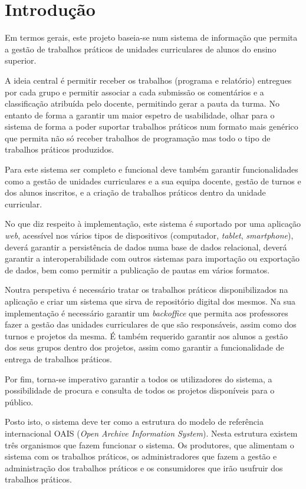 \section{Introdução}
Em termos gerais, este projeto baseia-se num sistema de informação que permita a gestão de trabalhos 
práticos de unidades curriculares de alunos do ensino superior.

A ideia central é permitir receber os trabalhos (programa e relatório) entregues por cada grupo e 
permitir associar a cada submissão os comentários e a classificação atribuída pelo docente, 
permitindo gerar a pauta da turma. No entanto de forma a garantir um maior 
espetro de usabilidade, olhar para o sistema de forma a poder suportar 
trabalhos práticos num formato mais genérico que permita não só receber 
trabalhos de programação mas todo o tipo de trabalhos práticos produzidos.

Para este sistema ser completo e funcional deve também garantir funcionalidades como
a gestão de unidades curriculares e a sua equipa docente,  gestão de turnos e dos alunos inscritos, e a
criação de trabalhos práticos dentro da unidade curricular.

No que diz respeito à implementação, este sistema é suportado por uma aplicação \textit{web}, acessível
nos vários tipos de dispositivos (computador, \textit{tablet}, \textit{smartphone}), deverá garantir a persistência de 
dados numa base de dados relacional, deverá garantir a interoperabilidade com outros sistemas para
importação ou exportação de dados, bem como permitir a publicação de pautas em vários formatos.

Noutra perspetiva é necessário tratar os trabalhos práticos disponibilizados na aplicação
e criar um sistema que sirva de repositório digital dos mesmos. Na sua implementação é necessário
garantir um \textit{backoffice} que permita aos professores fazer a gestão das unidades curriculares
de que são responsáveis, assim como dos turnos e projetos da mesma. É também requerido garantir
aos alunos a gestão dos seus grupos dentro dos projetos, assim como garantir a funcionalidade
de entrega de trabalhos práticos.
 
 Por fim, torna-se imperativo garantir a todos os utilizadores do sistema, a possibilidade de procura
 e consulta de todos os projetos disponíveis para o público.
 
 Posto isto, o sistema deve ter como a estrutura do modelo de referência internacional OAIS 
 (\textit{Open Archive Information System}).
 Nesta estrutura existem três organismos que fazem funcionar o sistema. Os produtores, que 
 alimentam o sistema com os trabalhos práticos, os administradores que fazem a gestão e administração
 dos trabalhos práticos e os consumidores que irão usufruir dos trabalhos práticos. 
 
